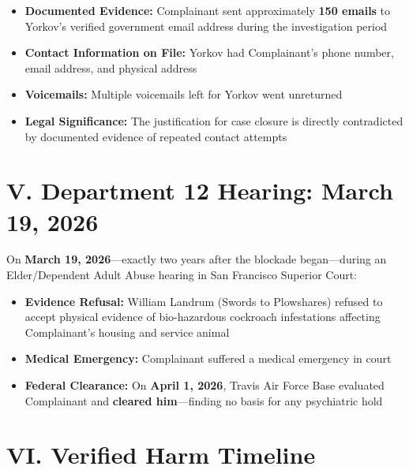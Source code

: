 \documentclass[11pt, a4paper]{article}
\begin{document}
\begin{itemize}
    \item \textbf{Documented Evidence:} Complainant sent approximately \textbf{150 emails} to Yorkov's verified government email address during the investigation period
    \item \textbf{Contact Information on File:} Yorkov had Complainant's phone number, email address, and physical address
    \item \textbf{Voicemails:} Multiple voicemails left for Yorkov went unreturned
    \item \textbf{Legal Significance:} The justification for case closure is directly contradicted by documented evidence of repeated contact attempts
\end{itemize}

\vspace{0.5cm}

\section{V. Department 12 Hearing: March 19, 2026}

On \textbf{March 19, 2026}---exactly two years after the blockade began---during an Elder/Dependent Adult Abuse hearing in San Francisco Superior Court:

\begin{itemize}
    \item \textbf{Evidence Refusal:} William Landrum (Swords to Plowshares) refused to accept physical evidence of bio-hazardous cockroach infestations affecting Complainant's housing and service animal
    \item \textbf{Medical Emergency:} Complainant suffered a medical emergency in court
    \item \textbf{Federal Clearance:} On \textbf{April 1, 2026}, Travis Air Force Base evaluated Complainant and \textbf{cleared him}---finding no basis for any psychiatric hold
\end{itemize}

\vspace{0.5cm}

\section{VI. Verified Harm Timeline}
\end{document}
